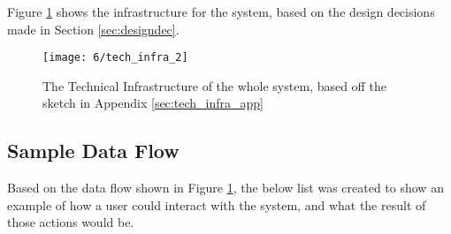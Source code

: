 \documentclass[../dissertation.tex]{subfiles}
\begin{document}
Figure \ref{fig:techinfra} shows the infrastructure for the system, based on the design decisions made in Section \ref{sec:designdec}.

\begin{figure}[H]
    \centering
    \texttt{[image: 6/tech\_infra\_2]}
    \caption{The Technical Infrastructure of the whole system, based off the sketch in Appendix \ref{sec:tech_infra_app}}
    \label{fig:techinfra}
\end{figure}

\subsection{Sample Data Flow}

Based on the data flow shown in Figure \ref{fig:techinfra}, the below list was created to show an example of how a user could interact with the system, and what the result of those actions would be.
\end{document}
